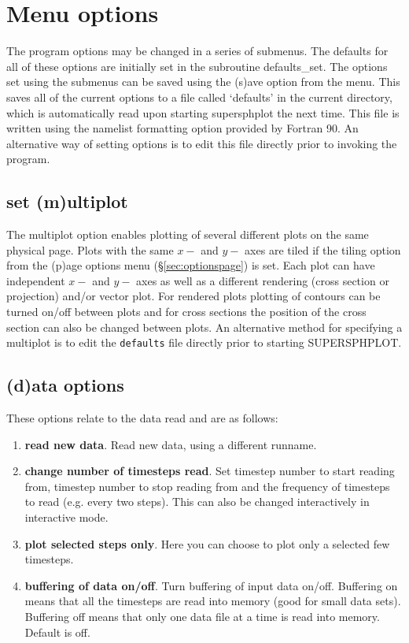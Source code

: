 \documentclass[a4paper,12pt]{article}
\begin{document}
\section{Menu options}
 The program options may be changed in a series of submenus. The defaults for all of
these options are initially set in the subroutine defaults\_set. The options set using
the submenus can be saved using the (s)ave option from the menu. This saves all of
the current options to a file called `defaults' in the current directory, which is
automatically read upon starting supersphplot the next time. This file is written using
the namelist formatting option provided by Fortran 90. An alternative way of setting
options is to edit this file directly prior to invoking the program.

\subsection{set (m)ultiplot}
 The multiplot option enables plotting of several different plots on the same
physical page. Plots with the same $x-$ and $y-$ axes are tiled if the tiling
option from the (p)age options menu (\S\vref{sec:optionspage}) is set. Each plot
can have independent $x-$ and $y-$ axes as well as a different rendering (cross
section or projection) and/or vector plot. For rendered plots plotting of
contours can be turned on/off between plots and for cross sections the position of
the cross section can also be changed between plots. An alternative method for
specifying a multiplot is to edit the \verb+defaults+ file directly prior to
starting SUPERSPHPLOT.

\subsection{(d)ata options}
These options relate to the data read and are as follows:
\begin{enumerate}
\item \textbf{read new data}. Read new data, using a different runname.
\item \textbf{change number of timesteps read}. Set timestep number to start
reading from, timestep number to stop reading from and the frequency of
timesteps to read (e.g. every two steps). This can also be changed interactively in
interactive mode.
\item \textbf{plot selected steps only}. Here you can choose to plot only a selected
few timesteps.
\item \textbf{buffering of data on/off}. Turn buffering of input data on/off.
Buffering on means that all the timesteps are read into memory (good for small
data sets). Buffering off means that only one data file at a time is read into
memory. Default is off.
\end{enumerate}
\end{document}
